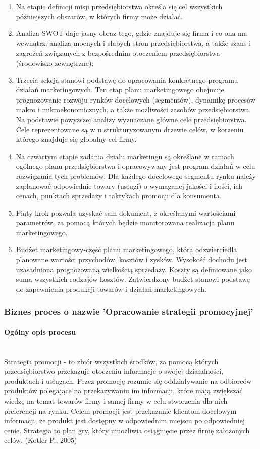 \documentclass[a4paper, 12pt]{article}
\begin{document}
\begin{enumerate}
	\item Na etapie definicji misji przedsiębiorstwa określa się cel wszystkich późniejszych obszarów, w których firmy może działać.
	\item Analiza SWOT daje jasny obraz tego, gdzie znajduje się firma i co ona ma wewnątrz: analiza mocnych i słabych stron przedsiębiorstwa, a także szans i zagrożeń związanych z bezpośrednim otoczeniem przedsiębiorstwa (środowisko zewnętrzne);
	\item Trzecia sekcja stanowi podstawę do opracowania konkretnego programu działań marketingowych. Ten etap planu marketingowego obejmuje prognozowanie rozwoju rynków docelowych (segmentów), dynamikę procesów makro i mikroekonomicznych, a także możliwości zasobów przedsiębiorstwa. Na podstawie powyższej analizy wyznaczane główne cele  przedsiębiorstwa. Cele reprezentowane są w u strukturyzowanym drzewie celów, w korzeniu którego znajduje się globalny cel firmy.
	\item Na czwartym etapie zadania działu marketingu są określane w ramach ogólnego planu przedsiębiorstwa i opracowywany jest program działań w celu rozwiązania tych problemów. Dla każdego docelowego segmentu rynku należy zaplanować odpowiednie towary (usługi) o wymaganej jakości i ilości, ich cenach, punktach sprzedaży i taktykach promocji dla konsumenta.
	\item Piąty krok pozwala uzyskać sam dokument, z określanymi wartościami parametrów, za pomocą których będzie monitorowana realizacja planu marketingowego.
	\item Budżet marketingowy-część planu marketingowego, która odzwierciedla planowane wartości przychodów, kosztów i zysków. Wysokość dochodu jest uzasadniona prognozowaną wielkością sprzedaży. Koszty są definiowane jako suma wszystkich rodzajów kosztów. Zatwierdzony budżet stanowi podstawę do zapewnienia produkcji towarów i działań marketingowych.
\end{enumerate}



\subsubsection{Biznes proces o nazwie 'Opracowanie strategii promocyjnej'}
\paragraph{Ogólny opis procesu}\mbox{}\\
\hspace*{1 cm}Strategia promocji - to zbiór wszystkich środków, za pomocą których przedsiębiorstwo przekazuje otoczeniu informacje o swojej działalności, produktach i usługach. Przez promocję rozumie się oddziaływanie na odbiorców produktów polegające na przekazywaniu im informacji, które mają zwiększać wiedzę na temat towarów firmy i samej firmy w celu stworzenia dla nich preferencji na rynku.
\newline \hspace*{1 cm}Celem promocji jest przekazanie klientom docelowym informacji, że produkt jest dostępny w odpowiednim miejscu po odpowiedniej cenie. Strategia to plan gry, który umożliwia osiągnięcie przez firmę założonych celów. (Kotler P., 2005)
\end{document}
